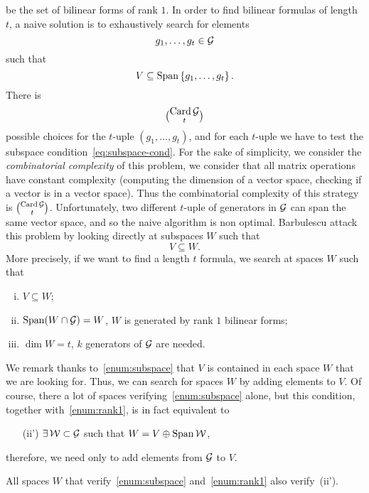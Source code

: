 be the set of bilinear forms of rank $1$. In order to find bilinear formulas of
length $t$, a naive solution is to exhaustively search for elements 
\[
  g_1, \dots, g_t\in\mathcal{G}
\]
such that
\begin{equation}
  V\subseteq\operatorname{Span}\left\{ g_1, \dots, g_t \right\}.
  \label{eq:subspace-cond}
\end{equation}
There is 
\[
  {\operatorname{Card}\mathcal{G}}\choose{t}
\]
possible choices for the $t$-uple $(g_1, \dots, g_t)$, and for each $t$-uple we
have to test the subspace condition~\eqref{eq:subspace-cond}. For the sake of
simplicity, we consider the \emph{combinatorial complexity} of this problem, \ie
we consider that all matrix operations have constant complexity (\eg computing
the dimension of a vector space, checking if a vector is in a vector space).
Thus the combinatorial complexity of this strategy is ${\operatorname{Card}\mathcal{G}}\choose{t}$.
Unfortunately, two different $t$-uple of generators in $\mathcal{G}$ can span the same
vector space, and so the naive algorithm is non optimal. Barbulescu \etal attack
this problem by looking directly at subspaces $W$ such that
\[
V\subseteq W.
\]
More precisely, if we want to find a length $t$ formula, we search at spaces $W$ such that
\begin{enumerate}[(i)]
  \item \label{enum:subspace} $V\subseteq W$;
  \item \label{enum:rank1} $\operatorname{Span}(W\cap\mathcal{G}) = W$, \ie $W$ is generated by rank $1$ bilinear forms;
  \item $\dim W = t$, \ie $k$ generators of $\mathcal{G}$ are needed.
\end{enumerate}
We remark thanks to~\ref{enum:subspace} that $V$ is contained in each space $W$
that we are looking for. Thus, we can search for spaces $W$ by adding elements
to $V$. Of course, there a lot of spaces verifying~\ref{enum:subspace}
alone, but this condition, together with~\ref{enum:rank1}, is in fact equivalent
to
\begin{enumerate}
  \item[(ii')] \label{enum:sum} $\exists\,\mathcal{W}\subset\mathcal{G}$ such that
    $W=V\oplus\operatorname{Span}\mathcal{W}$,
\end{enumerate}
therefore, we need only to add elements from $\mathcal{G}$ to $V$.
\begin{lm}
  All spaces $W$ that verify~\ref{enum:subspace} and~\ref{enum:rank1} also
  verify~(ii').
\end{lm}
